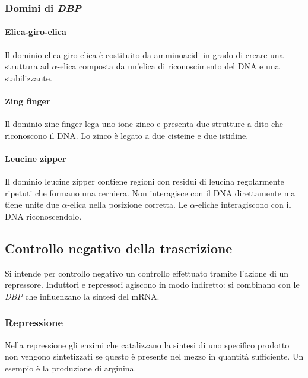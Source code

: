 		\subsubsection{Domini di  \emph{DBP}}

			\paragraph{Elica-giro-elica}
			Il dominio elica-giro-elica \`e costituito da amminoacidi in grado di creare una struttura ad $\alpha$-elica composta da un'elica di riconoscimento del DNA e una stabilizzante.

			\paragraph{Zing finger}
			Il dominio zinc finger lega uno ione zinco e presenta due strutture a dito che riconoscono il DNA.
			Lo zinco \`e legato a due cisteine e due istidine.

			\paragraph{Leucine zipper}
			Il dominio leucine zipper contiene regioni con residui di leucina regolarmente ripetuti che formano una cerniera.
			Non interagisce con il DNA direttamente ma tiene unite due $\alpha$-elica nella posizione corretta.
			Le $\alpha$-eliche interagiscono con il DNA riconoscendolo.

	\subsection{Controllo negativo della trascrizione}
	Si intende per controllo negativo un controllo effettuato tramite l'azione di un repressore. 
	Induttori e repressori agiscono in modo indiretto: si combinano con le \emph{DBP} che influenzano la sintesi del mRNA.

		\subsubsection{Repressione}
		Nella repressione gli enzimi che catalizzano la sintesi di uno specifico prodotto non vengono sintetizzati se questo \`e presente nel mezzo in quantit\`a sufficiente.
		Un esempio \`e la produzione di arginina.

